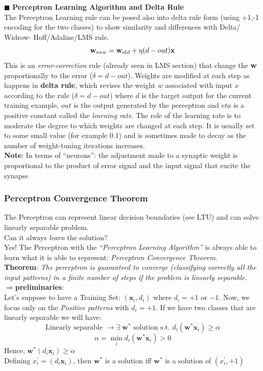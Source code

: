 \documentclass[../main.tex]{subfiles}
\begin{document}
\noindent$\blacksquare$ \textbf{Perceptron Learning Algorithm and Delta Rule}\\
\noindent The Perceptron Learning rule can be posed also into delta rule form (using
+1,-1 encoding for the two classes) to show similarity and differences with Delta/ Widrow- Hoff/Adaline/LMS rule.
$$\bold{w}_{new} = \bold{w}_{old} + \eta (d-out)\bold{x}$$
This is an \emph{error-correction} rule (already seen in LMS section) that change the $\bold{w}$ proportionally to the error ($\delta = d-out$).
Weights are modified at each step as happens in \textbf{delta rule}, which revises the weight $w$ associated with input $x$ according to the rule
($\delta = d-out$) where $d$ is the target output for the current training example, $out$ is the output generated by the perceptron and $eta$ is a positive constant called the \emph{learning rate}. The role of the learning rate is to moderate the degree to which weights are changed at each step. It is usually set to some small value (for example 0.1) and is sometimes made to decay as the number of weight-tuning iterations increases.\\

\noindent\textbf{Note}: In terms of “neurons”: the adjustment made to a synaptic weight is proportional to the product of error signal and the input signal that excite the synapse\\


\subsubsection{Perceptron Convergence Theorem}
The Perceptron can represent linear decision boundaries (see LTU) and can solve linearly separable problem.\\
Can it always \emph{learn} the solution?\\
Yes! The Perceptron with the \emph{“Perceptron Learning Algorithm”} is always able to learn what it is able to represent: \emph{Perceptron Convergence Theorem}.\\
\newline
\textbf{Theorem}: \emph{The perceptron is guaranteed to converge (classifying correctly all the input patterns) in a finite number of steps if the problem is linearly separable.}\\

\noindent$\Rightarrow$\textbf{preliminaries}:\\
Let's suppose to have a Training Set: $(\mathbf{x}_i, d_i)$ where $d_i = +1$ or $-1$. Now, we focus only on the \textit{Positive patterns} with $d_i = +1$. If we have two classes that are linearly separable we will have:
$$ \text{Linearly separable }\rightarrow \exists \; \mathbf{w}^* \text{ solution s.t. } d_i(\mathbf{w^*}\mathbf{x}_i) \geq \alpha$$
$$ \alpha = \min_i d_i(\mathbf{w^*}\mathbf{x}_i) > 0$$
Hence, $\mathbf{w^*}(d_i\mathbf{x}_i) \geq \alpha$\\
\noindent Defining $x^{'}_{i} = (d_i\mathbf{x}_i)$, then $\mathbf{w}^*$ is a solution iff $\mathbf{w^*}$ is a solution of $(x^{'}_{i}, +1)$\\
\end{document}
